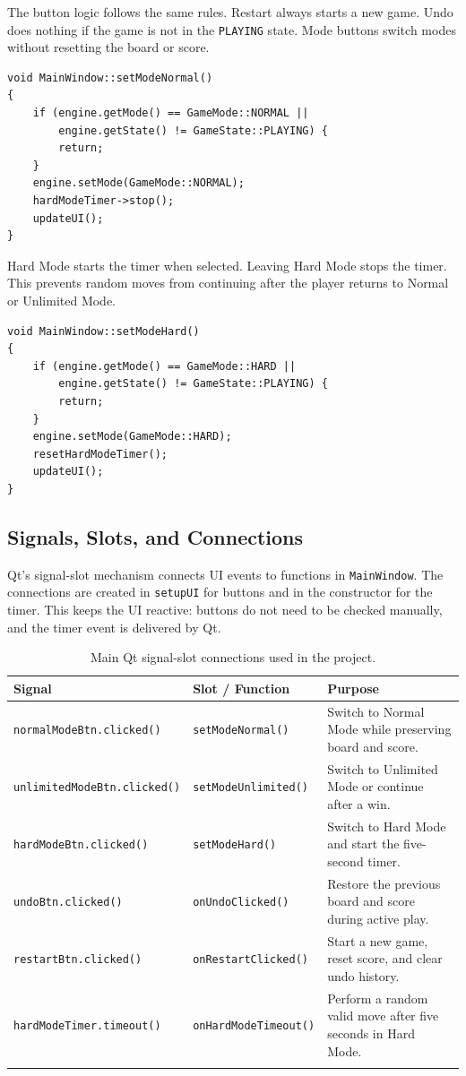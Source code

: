 \documentclass[a4paper,12pt]{article}
\begin{document}
The button logic follows the same rules. Restart always starts a new game. Undo does nothing if the game is not in the \texttt{PLAYING} state. Mode buttons switch modes without resetting the board or score.

\begin{lstlisting}[style=CppStyle,caption={Normal Mode switch preserves the board}]
void MainWindow::setModeNormal()
{
    if (engine.getMode() == GameMode::NORMAL ||
        engine.getState() != GameState::PLAYING) {
        return;
    }
    engine.setMode(GameMode::NORMAL);
    hardModeTimer->stop();
    updateUI();
}
\end{lstlisting}

Hard Mode starts the timer when selected. Leaving Hard Mode stops the timer. This prevents random moves from continuing after the player returns to Normal or Unlimited Mode.

\begin{lstlisting}[style=CppStyle,caption={Hard Mode starts the timer without restarting}]
void MainWindow::setModeHard()
{
    if (engine.getMode() == GameMode::HARD ||
        engine.getState() != GameState::PLAYING) {
        return;
    }
    engine.setMode(GameMode::HARD);
    resetHardModeTimer();
    updateUI();
}
\end{lstlisting}

\subsection{Signals, Slots, and Connections}

Qt's signal-slot mechanism connects UI events to functions in \texttt{MainWindow}. The connections are created in \texttt{setupUI} for buttons and in the constructor for the timer. This keeps the UI reactive: buttons do not need to be checked manually, and the timer event is delivered by Qt.

\begin{longtable}{|p{4.4cm}|p{4.2cm}|p{5.4cm}|}
\hline
\textbf{Signal} & \textbf{Slot / Function} & \textbf{Purpose} \\
\hline
\texttt{normalModeBtn.clicked()} & \texttt{setModeNormal()} & Switch to Normal Mode while preserving board and score. \\
\hline
\texttt{unlimitedModeBtn.clicked()} & \texttt{setModeUnlimited()} & Switch to Unlimited Mode or continue after a win. \\
\hline
\texttt{hardModeBtn.clicked()} & \texttt{setModeHard()} & Switch to Hard Mode and start the five-second timer. \\
\hline
\texttt{undoBtn.clicked()} & \texttt{onUndoClicked()} & Restore the previous board and score during active play. \\
\hline
\texttt{restartBtn.clicked()} & \texttt{onRestartClicked()} & Start a new game, reset score, and clear undo history. \\
\hline
\texttt{hardModeTimer.timeout()} & \texttt{onHardModeTimeout()} & Perform a random valid move after five seconds in Hard Mode. \\
\hline
\caption{Main Qt signal-slot connections used in the project.}
\end{longtable}
\end{document}
